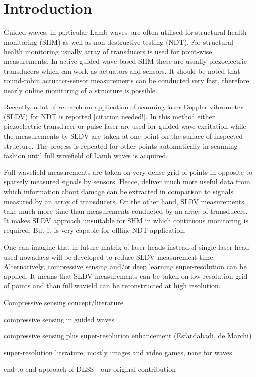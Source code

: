 \section{Introduction}
Guided waves, in particular Lamb waves, are often utilised for structural health monitoring (SHM) as well as non-destructive testing (NDT).
For structural health monitoring usually array of transducers is used for point-wise measurements.
In active guided wave based SHM these are usually piezoelectric transducers which can work as actuators and sensors.
It should be noted that round-robin actuator-sensor measurements can be conducted very fast, therefore nearly online monitoring of a structure is possible.

Recently, a lot of research on application of scanning laser Doppler vibrometer (SLDV) for NDT is reported \textcolor{RubineRed}{[citation needed!]}.
In this method either piezoelectric transducer or pulse laser are used for guided wave excitation while the measurements by SLDV are taken at one point on the surface of inspected structure.
The process is repeated for other points automatically in scanning fashion until full wavefield of Lamb waves is acquired.

Full wavefield measurements are taken on very dense grid of points in opposite to sparsely measured signals by sensors.
Hence, deliver much more useful data from which information about damage can be extracted in comparison to signals measured by an array of transducers.
On the other hand, SLDV measurements take much more time than measurements conducted by an array of transducers.
It makes SLDV approach unsuitable for SHM in which continuous monitoring is required.
But it is very capable for offline NDT application.

One can imagine that in future matrix of laser heads instead of single laser head used nowadays will be developed to reduce SLDV measurement time.
Alternatively, compressive sensing and/or deep learning super-resolution can be applied.
It means that SLDV measurements can be taken on low resolution grid of points and than full wavield can be reconstructed at high resolution.

{\color{RubineRed}

Compressive sensing concept/literature

compressive sensing in guided waves

compressive sensing plus super-resolution enhancement (Esfandabadi, de Marchi)

super-resolution literature, mostly images and video games, none for waves

end-to-end approach of DLSS - our original contribution
}